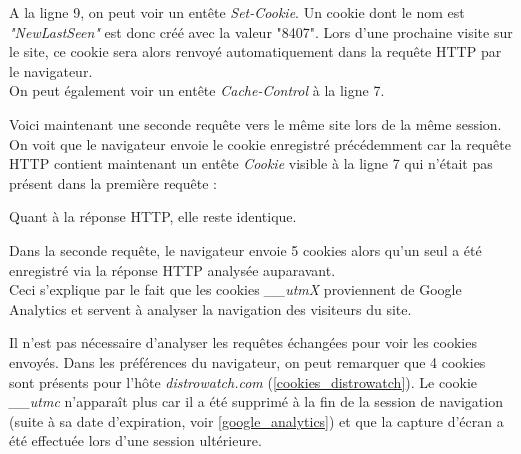 \begin{singlespacing}

\end{singlespacing}
A la ligne 9, on peut voir un entête \textit{Set-Cookie}. Un cookie dont le nom est \textit{"NewLastSeen"} est donc créé avec la valeur "8407". Lors d'une prochaine visite sur le site, ce cookie sera alors renvoyé automatiquement dans la requête HTTP par le navigateur.\\
On peut également voir un entête \textit{Cache-Control} à la ligne 7.
\newline

Voici maintenant une seconde requête vers le même site lors de la même session. On voit que le navigateur envoie le cookie enregistré précédemment car la requête HTTP contient maintenant un entête \textit{Cookie} visible à la ligne 7 qui n'était pas présent dans la première requête :

\begin{singlespacing}

\end{singlespacing}

Quant à la réponse HTTP, elle reste identique.
\newline

Dans la seconde requête, le navigateur envoie 5 cookies alors qu'un seul a été enregistré via la réponse HTTP analysée auparavant.\\
Ceci s'explique par le fait que les cookies \textit{\_\_utmX} proviennent de Google Analytics \cite{Google_Analytics_cookies} et servent à analyser la navigation des visiteurs du site.
\newline

Il n'est pas nécessaire d'analyser les requêtes échangées pour voir les cookies envoyés. Dans les préférences du navigateur, on peut remarquer que 4 cookies sont présents pour l'hôte \textit{distrowatch.com} (\autoref{cookies_distrowatch}). Le cookie \textit{\_\_utmc} n'apparaît plus car il a été supprimé à la fin de la session de navigation (suite à sa date d'expiration, voir \autoref{google_analytics}) et que la capture d'écran a été effectuée lors d'une session ultérieure.

